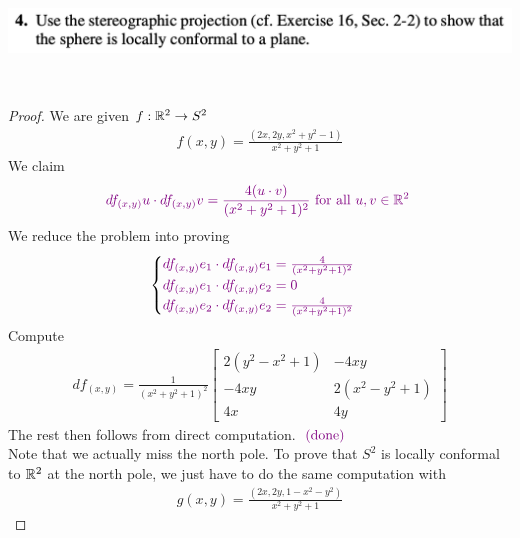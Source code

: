 \documentclass{report}
\begin{document}
\begin{question}{}{}
\includegraphics[height=3cm,width=18cm]{hw61}
\end{question}
\begin{proof}
We are given $f:\mathbb{R}^2 \rightarrow S^2$
\begin{align*}
f(x,y)= \frac{(2x,2y,x^2+y^2-1)}{x^2+y^2+1}
\end{align*}
We claim 
\begin{align*}
  \textcolor{violet}{df_{(x,y)}u\cdot df_{(x,y)}v= \frac{4(u\cdot v)}{(x^2+y^2+1)^2}\text{ for all $u,v \in\mathbb{R}^2$ }}
\end{align*}
We reduce the problem into proving 
\begin{align*}
\begin{cases}
  \textcolor{violet}{df_{(x,y)}e_1 \cdot df_{(x,y)}e_1 = \frac{4}{(x^2+y^2+1)^2}}\\
  \textcolor{violet}{df_{(x,y)}e_1\cdot df_{(x,y)}e_2= 0}\\
  \textcolor{violet}{df_{(x,y)}e_2\cdot df_{(x,y)}e_2= \frac{4}{(x^2+y^2+1)^2}}
\end{cases}
\end{align*}
Compute 
\begin{align*}
df_{(x,y)}=\frac{1}{(x^2+y^2+1)^2} \begin{bmatrix}
  2(y^2-x^2+1) & -4xy\\
  -4xy & 2(x^2-y^2+1)\\
  4x & 4y
\end{bmatrix}
\end{align*}
The rest then follows from direct computation. $\textcolor{violet}{\text{ (done) }}$\\

Note that we actually miss the north pole. To prove that $S^2$ is locally conformal to  $\mathbb{R}^2$ at the north pole, we just have to do the same computation with
\begin{align*}
g(x,y)=  \frac{(2x,2y,1-x^2-y^2)}{x^2+y^2+1}
\end{align*}
\end{proof}
\end{document}
